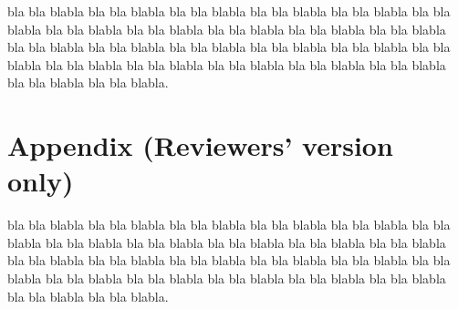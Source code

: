\documentclass[a4paper,10pt]{llncs}
\begin{document}
bla bla blabla bla bla blabla bla bla blabla bla bla blabla bla bla blabla
bla bla blabla bla bla blabla bla bla blabla bla bla blabla bla bla blabla
bla bla blabla bla bla blabla bla bla blabla bla bla blabla bla bla blabla
bla bla blabla bla bla blabla bla bla blabla bla bla blabla bla bla blabla
bla bla blabla bla bla blabla bla bla blabla bla bla blabla.







\newpage
\section*{Appendix (Reviewers' version only)}

bla bla blabla bla bla blabla bla bla blabla bla bla blabla bla bla blabla
bla bla blabla bla bla blabla bla bla blabla bla bla blabla bla bla blabla
bla bla blabla bla bla blabla bla bla blabla bla bla blabla bla bla blabla
bla bla blabla bla bla blabla bla bla blabla bla bla blabla bla bla blabla
bla bla blabla bla bla blabla bla bla blabla bla bla blabla.

\end{document}
